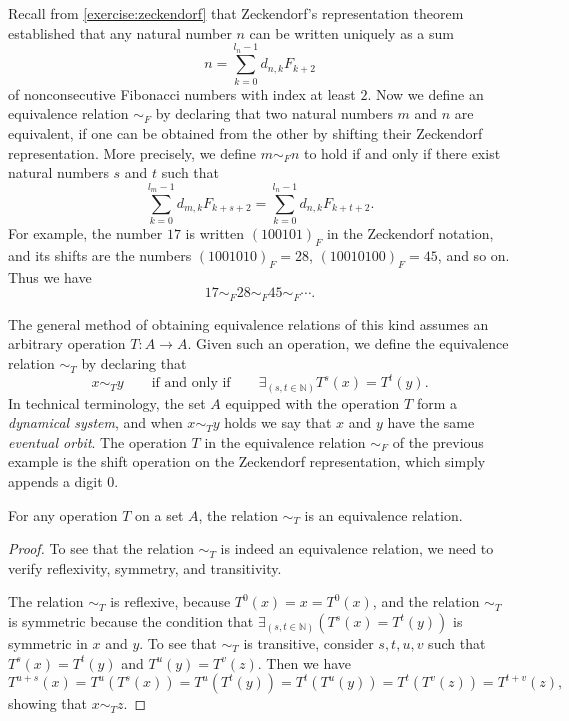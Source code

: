 \begin{example}
  Recall from \cref{exercise:zeckendorf} that Zeckendorf's representation theorem established that any natural number $n$ can be written uniquely as a sum
  \begin{equation*}
    n= \sum_{k=0}^{l_n-1} d_{n,k}F_{k+2}
  \end{equation*}
  of nonconsecutive Fibonacci numbers with index at least $2$. Now we define an equivalence relation $\sim_F$ by declaring that two natural numbers $m$ and $n$ are equivalent, if one can be obtained from the other by shifting their Zeckendorf representation. More precisely, we define $m\sim_F n$ to hold if and only if there exist natural numbers $s$ and $t$ such that
  \begin{equation*}
    \sum_{k=0}^{l_m-1}d_{m,k}F_{k+s+2} = \sum_{k=0}^{l_n-1} d_{n,k}F_{k+t+2}.
  \end{equation*}
  For example, the number $17$ is written $(100101)_F$ in the Zeckendorf notation, and its shifts are the numbers $(1001010)_F=28$, $(10010100)_F=45$, and so on. Thus we have
  \begin{equation*}
    17 \sim_F 28 \sim_F 45 \sim_F\cdots.
  \end{equation*}
\end{example}

The general method of obtaining equivalence relations of this kind assumes an arbitrary operation $T:A\to A$. Given such an operation, we define the equivalence relation $\sim_T$ by declaring that
\begin{equation*}
  x\sim_T y \qquad\text{if and only if}\qquad \exists_{(s,t\in\mathbb{N})} T^s(x)=T^t(y).
\end{equation*}
In technical terminology, the set $A$ equipped with the operation $T$ form a \emph{dynamical system}, and when $x\sim_T y$ holds we say that $x$ and $y$ have the same \emph{eventual orbit}. The operation $T$ in the equivalence relation $\sim_F$ of the previous example is the shift operation on the Zeckendorf representation, which simply appends a digit $0$.

\begin{proposition}
  For any operation $T$ on a set $A$, the relation $\sim_T$ is an equivalence relation.
\end{proposition}

\begin{proof}
  To see that the relation $\sim_T$ is indeed an equivalence relation, we need to verify reflexivity, symmetry, and transitivity.

  The relation $\sim_T$ is reflexive, because $T^0(x)=x=T^0(x)$, and the relation $\sim_T$ is symmetric because the condition that $\exists_{(s,t\in\mathbb{N})}(T^s(x)=T^t(y))$ is symmetric in $x$ and $y$. To see that $\sim_T$ is transitive, consider $s,t,u,v$ such that $T^s(x)=T^t(y)$ and $T^u(y)=T^v(z)$. Then we have
  \begin{equation*}
    T^{u+s}(x)=T^u(T^s(x))=T^u(T^t(y))=T^t(T^u(y))=T^t(T^v(z))=T^{t+v}(z),
  \end{equation*}
  showing that $x\sim_T z$.
\end{proof}

